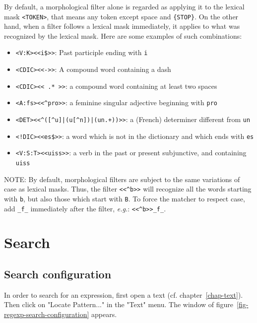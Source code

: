 \noindent By default, a morphological filter alone is regarded as applying it to the lexical
mask \verb$<TOKEN>$, that means any token except space and \verb+{STOP}+. On the other hand,
when a filter follows a lexical mask immediately, it applies to what was recognized by the lexical
mask. Here are some examples of such combinations:

\begin{itemize}
  \item \verb+<V:K><<i$>>+: Past participle ending with \verb$i$
  \item \verb!<CDIC><<->>!: A compound word containing a dash
  \item \verb!<CDIC><< .* >>!: a compound word containing at least two spaces
  \item \verb!<A:fs><<^pro>>!: a feminine singular adjective beginning with \verb$pro$
  \item \verb!<DET><<^([^u]|(u[^n])|(un.+))>>!: a (French) determiner different from \verb$un$
  \item \verb+<!DIC><<es$>>+: a word which is not in the dictionary and which ends with \verb$es$
  \item \verb!<V:S:T><<uiss>>!: a verb in the past or present subjunctive, and containing \verb$uiss$
\end{itemize}

\noindent {}NOTE: By default, morphological filters are
subject to the same variations of case as lexical masks. Thus, the filter
\verb$<<^b>>$ will recognize all the words starting with
\texttt{b}, but also those which start with \texttt{B}. 
To force the matcher to respect case, add \verb+_f_+ immediately
after the filter, \textit{e.g.}: \verb+<<^b>>_f_+.



\section{Search}
\subsection{Search configuration}
\label{section-search-configuration}
In order to search for an expression, first open a text (cf.
chapter~\ref{chap-text}). Then click on "Locate Pattern..." in the "Text" menu.
The window of
figure~\ref{fig-regexp-search-configuration}
appears.


